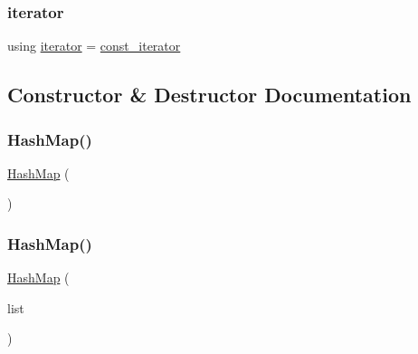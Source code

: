 \mbox{\label{classHashMap_ab3d10e70baaeac78e76b7abae7e2cf76}} 
\subsubsection{\texorpdfstring{iterator}{iterator}}
{\footnotesize\ttfamily using \mbox{\hyperlink{classHashMap_ab3d10e70baaeac78e76b7abae7e2cf76}{iterator}} =  \mbox{\hyperlink{classHashMap_a914487582193dbbeb2879c06f9671636}{const\+\_\+iterator}}}



\subsection{Constructor \& Destructor Documentation}
\mbox{\label{classHashMap_a3027d2d14763d6db504f99530ae6d08d}} 
\subsubsection{\texorpdfstring{Hash\+Map()}{HashMap()}\hspace{0.1cm}{\footnotesize\ttfamily [1/2]}}
{\footnotesize\ttfamily \mbox{\hyperlink{classHashMap}{Hash\+Map}} (\begin{DoxyParamCaption}{ }\end{DoxyParamCaption})\hspace{0.3cm}{\ttfamily [default]}}

\mbox{\label{classHashMap_ab753a1db3cac1cff8349801d448ec63d}} 
\subsubsection{\texorpdfstring{Hash\+Map()}{HashMap()}\hspace{0.1cm}{\footnotesize\ttfamily [2/2]}}
{\footnotesize\ttfamily \mbox{\hyperlink{classHashMap}{Hash\+Map}} (\begin{DoxyParamCaption}\item[{std\+::initializer\+\_\+list$<$ std\+::pair$<$ const Key\+Type, Value\+Type $>$$>$}]{list }\end{DoxyParamCaption})}

